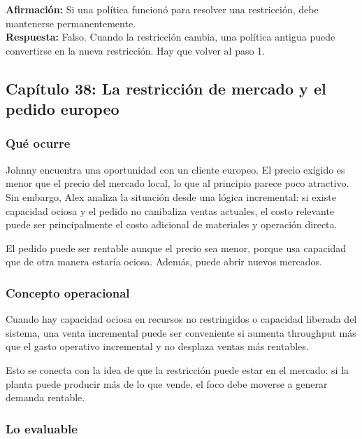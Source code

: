 \documentclass[
  11pt,
]{article}
\begin{document}
\textbf{Afirmación:} Si una política funcionó para resolver una
restricción, debe mantenerse permanentemente.\\
\textbf{Respuesta:} Falso. Cuando la restricción cambia, una política
antigua puede convertirse en la nueva restricción. Hay que volver al
paso 1.

\hypertarget{capuxedtulo-38-la-restricciuxf3n-de-mercado-y-el-pedido-europeo}{%
\subsection{Capítulo 38: La restricción de mercado y el pedido
europeo}\label{capuxedtulo-38-la-restricciuxf3n-de-mercado-y-el-pedido-europeo}}

\hypertarget{quuxe9-ocurre-11}{%
\subsubsection{Qué ocurre}\label{quuxe9-ocurre-11}}

Johnny encuentra una oportunidad con un cliente europeo. El precio
exigido es menor que el precio del mercado local, lo que al principio
parece poco atractivo. Sin embargo, Alex analiza la situación desde una
lógica incremental: si existe capacidad ociosa y el pedido no canibaliza
ventas actuales, el costo relevante puede ser principalmente el costo
adicional de materiales y operación directa.

El pedido puede ser rentable aunque el precio sea menor, porque usa
capacidad que de otra manera estaría ociosa. Además, puede abrir nuevos
mercados.

\hypertarget{concepto-operacional-11}{%
\subsubsection{Concepto operacional}\label{concepto-operacional-11}}

Cuando hay capacidad ociosa en recursos no restringidos o capacidad
liberada del sistema, una venta incremental puede ser conveniente si
aumenta throughput más que el gasto operativo incremental y no desplaza
ventas más rentables.

Esto se conecta con la idea de que la restricción puede estar en el
mercado: si la planta puede producir más de lo que vende, el foco debe
moverse a generar demanda rentable.

\hypertarget{lo-evaluable-11}{%
\subsubsection{Lo evaluable}\label{lo-evaluable-11}}
\end{document}
